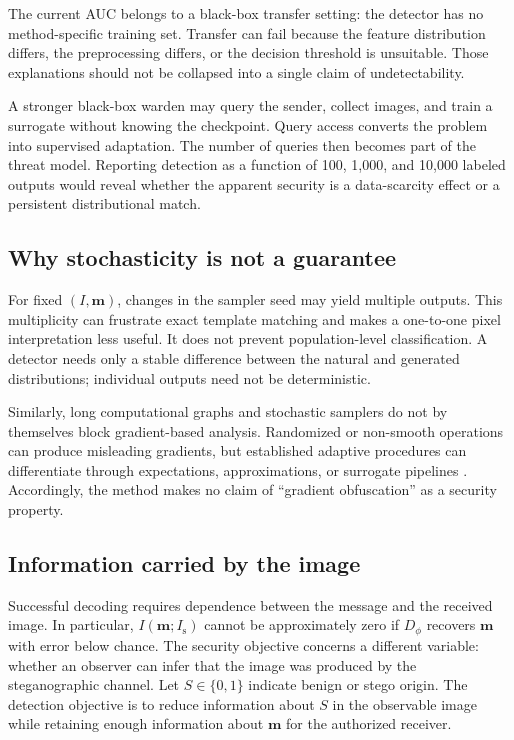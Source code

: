 \documentclass[pdflatex,sn-mathphys-num]{sn-jnl}
\newcommand{\stego}{I_{\mathrm{s}}}
\newcommand{\msg}{\mathbf{m}}
\begin{document}
The current AUC belongs to a black-box transfer setting: the detector has no method-specific training set. Transfer can fail because the feature distribution differs, the preprocessing differs, or the decision threshold is unsuitable. Those explanations should not be collapsed into a single claim of undetectability.

A stronger black-box warden may query the sender, collect images, and train a surrogate without knowing the checkpoint. Query access converts the problem into supervised adaptation. The number of queries then becomes part of the threat model. Reporting detection as a function of 100, 1,000, and 10,000 labeled outputs would reveal whether the apparent security is a data-scarcity effect or a persistent distributional match.

\subsection{Why stochasticity is not a guarantee}

For fixed $(I,\msg)$, changes in the sampler seed may yield multiple outputs. This multiplicity can frustrate exact template matching and makes a one-to-one pixel interpretation less useful. It does not prevent population-level classification. A detector needs only a stable difference between the natural and generated distributions; individual outputs need not be deterministic.

Similarly, long computational graphs and stochastic samplers do not by themselves block gradient-based analysis. Randomized or non-smooth operations can produce misleading gradients, but established adaptive procedures can differentiate through expectations, approximations, or surrogate pipelines \cite{athalye2018obfuscated}. Accordingly, the method makes no claim of ``gradient obfuscation'' as a security property.

\subsection{Information carried by the image}

Successful decoding requires dependence between the message and the received image. In particular, $I(\msg;\stego)$ cannot be approximately zero if $D_{\phi}$ recovers $\msg$ with error below chance. The security objective concerns a different variable: whether an observer can infer that the image was produced by the steganographic channel. Let $S\in\{0,1\}$ indicate benign or stego origin. The detection objective is to reduce information about $S$ in the observable image while retaining enough information about $\msg$ for the authorized receiver.
\end{document}
